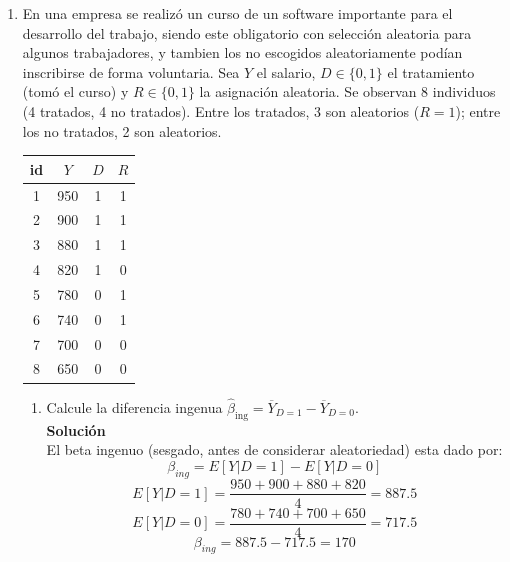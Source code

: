 \documentclass[10pt,a4paper]{article}
\begin{document}
\begin{enumerate}
{$R^2$:
\[
SST=132{,}000,\qquad SSR=19{,}500
\]
\[
SSE=SST-SSR=132{,}000-19{,}500=12{,}500,\qquad
R^2=\frac{SSR}{SST}=\frac{112{,}500}{132{,}000}\approx 0.8523.
\]

\textbf{Lectura:} $\widehat{Salario}=115+75\cdot Educ$. Un año adicional de educación se asocia, en promedio, con \$75 más de salario. El ajuste explica $\approx 85.23\%$ de la variación de $Y$.}


\item En una empresa se realizó un curso de un software importante para el desarrollo del trabajo, siendo este obligatorio con selección aleatoria para algunos trabajadores, y tambien los no escogidos aleatoriamente podían inscribirse de forma voluntaria.
Sea $Y$ el salario, $D\in\{0,1\}$ el tratamiento (tomó el curso) y $R\in\{0,1\}$ la asignación aleatoria.
Se observan 8 individuos (4 tratados, 4 no tratados). Entre los tratados, 3 son aleatorios ($R=1$); entre los no tratados, 2 son aleatorios.

\begin{center}
\begin{tabular}{|c| c |c |c|}
\hline
id & $Y$ & $D$ & $R$\\
\hline
1 & 950 & 1 & 1\\
2 & 900 & 1 & 1\\
3 & 880 & 1 & 1\\
4 & 820 & 1 & 0\\
5 & 780 & 0 & 1\\
6 & 740 & 0 & 1\\
7 & 700 & 0 & 0\\
8 & 650 & 0 & 0\\
\hline
\end{tabular}
\end{center}

\begin{enumerate}
\item Calcule la diferencia ingenua $\hat\beta_{\text{ing}}=\overline{Y}_{D=1}-\overline{Y}_{D=0}$.
\\
\textbf{Solución}
\\
El beta ingenuo (sesgado, antes de considerar aleatoriedad) esta dado por:
$$\beta_{ing}=E[Y|D=1]-E[Y|D=0]$$
$$E[Y|D=1] = \frac{950+900+880+820}{4}=887.5$$
$$E[Y|D=0]=\frac{780+740+700+650}{4}=717.5$$
$$\beta_{ing}=887.5-717.5=170$$


\end{enumerate}
\end{enumerate}
\end{document}
